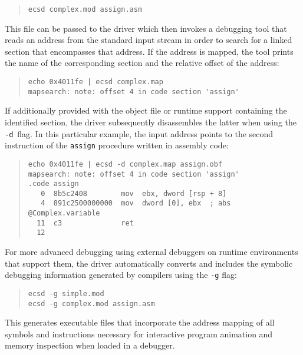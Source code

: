 \begin{quote}\begin{verbatim}
ecsd complex.mod assign.asm
\end{verbatim}\end{quote}

This file can be passed to the driver which then invokes a debugging tool that reads an address from the standard input stream in order to search for a linked section that encompasses that address.
If the address is mapped, the tool prints the name of the corresponding section and the relative offset of the address:

\begin{quote}\begin{verbatim}
echo 0x4011fe | ecsd complex.map
mapsearch: note: offset 4 in code section 'assign'
\end{verbatim}\end{quote}

If additionally provided with the object file or runtime support containing the identified section, the driver subsequently disassembles the latter when using the \texttt{-d}~flag.
In this particular example, the input address points to the second instruction of the \texttt{assign} procedure written in assembly code:

\begin{quote}\begin{verbatim}
echo 0x4011fe | ecsd -d complex.map assign.obf
mapsearch: note: offset 4 in code section 'assign'
.code assign
   0  8b5c2408        mov  ebx, dword [rsp + 8]
   4  891c2500000000  mov  dword [0], ebx  ; abs @Complex.variable
  11  c3              ret
  12
\end{verbatim}\end{quote}

For more advanced debugging using external debuggers on runtime environments that support them, the \ecs{} driver automatically converts and includes the symbolic debugging information generated by compilers using the \texttt{-g} flag:

\begin{quote}\begin{verbatim}
ecsd -g simple.mod
ecsd -g complex.mod assign.asm
\end{verbatim}\end{quote}

This generates executable files that incorporate the address mapping of all symbols and instructions necessary for interactive program animation and memory inspection when loaded in a debugger.

\concludechapter
